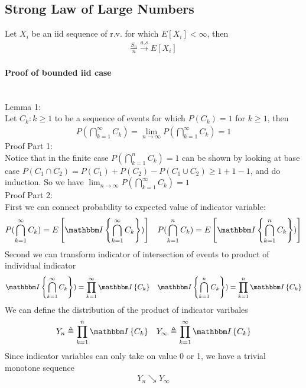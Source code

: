 \subsection{Strong Law of Large Numbers}
Let $X_i$ be an iid sequence of r.v. for which $E[X_i] < \infty$, then 
    \begin{align*}
        \frac{S_n}{n} \overset{a.s}{\to} E[X_i]
    \end{align*}
    
\paragraph{Proof of bounded iid case} \mbox{}\\

Lemma 1: \\
Let $C_k: k \geq 1$ to be a sequence of events for which $P(C_k) = 1$ for $k \geq 1$, then 
    \begin{align*}
        P(\bigcap_{k=1}^\infty C_k) = \lim_{n \to \infty} P(\bigcap_{k=1}^\infty C_k) = 1
    \end{align*}
Proof Part 1: \\
Notice that in the finite case $P(\bigcap_{k=1}^n C_k) = 1$ can be shown by looking at base case $P(C_1 \cap C_2) = P(C_1) + P(C_2) - P(C_1 \cup C_2) \geq 1+1-1$, and do induction. So we have $\lim_{n \to \infty} P(\bigcap_{k=1}^\infty C_k) = 1$\\


Proof Part 2: \\
First we can connect probability to expected value of indicator variable: 
    \begin{align*}
        P(\bigcap_{k=1}^\infty C_k) = E\left[\indic{\bigcap_{k=1}^\infty C_k})\right] & 
        & P(\bigcap_{k=1}^n C_k) = E\left[\indic{\bigcap_{k=1}^n C_k})\right]
    \end{align*}
Second we can transform indicator of intersection of events to product of individual indicator 
    \begin{align*}
        \indic{\bigcap_{k=1}^\infty C_k}) = \prod_{k=1}^\infty \indic{C_k} & & 
        \indic{\bigcap_{k=1}^n C_k}) = \prod_{k=1}^n \indic{C_k}
    \end{align*}
We can define the distribution of the product of indicator varibales
    \begin{align*}
        Y_n \triangleq \prod_{k=1}^n \indic{C_k} && Y_\infty \triangleq \prod_{k=1}^\infty \indic{C_k} \\
    \end{align*}
Since indicator variables can only take on value 0 or 1, we have a trivial monotone sequence 
    \begin{align*}
        Y_n \searrow Y_\infty
    \end{align*}
    
